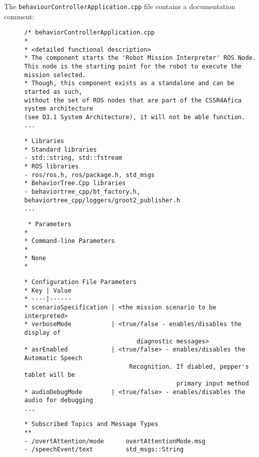 \documentclass{CSSRforAfrica}
\newcommand{\checkboxChecked}{\fbox{\ding{51}}} %
\begin{document}
\noindent The {\small \verb+behaviourControllerApplication.cpp+} file contains a documentation comment:

\begin{description}

\item[\checkboxChecked] 
 {\small 
\begin{verbatim}
/* behaviorControllerApplication.cpp
* 
* <detailed functional description>
* The component starts the 'Robot Mission Interpreter' ROS Node. 
This node is the starting point for the robot to execute the mission selected.
* Though, this component exists as a standalone and can be started as such, 
without the set of ROS nodes that are part of the CSSR4Afica system architecture
(see D3.1 System Architecture), it will not be able function.
...
\end{verbatim}}

\item[\checkboxChecked] 
 {\small 
\begin{verbatim}
* Libraries
* Standard libraries
- std::string, std::fstream
* ROS libraries
- ros/ros.h, ros/package.h, std_msgs
* BehaviorTree.Cpp libraries
- behaviortree_cpp/bt_factory.h, behaviortree_cpp/loggers/groot2_publisher.h
...
\end{verbatim}}

\item[\checkboxChecked] 
 {\small 
\begin{verbatim}
 * Parameters
*
* Command-line Parameters
*
* None
*
\end{verbatim}}


\item[\checkboxChecked] 
 {\small 
\begin{verbatim}
* Configuration File Parameters
* Key | Value
* ----|------
* scenarioSpecification | <the mission scenario to be interpreted>
* verboseMode           | <true/false - enables/disables the display of 
                               diagnostic messages>
* asrEnabled            | <true/false> - enables/disables the Automatic Speech 
                             Recognition. If diabled, pepper's tablet will be 
                                          primary input method
* audioDebugMode        | <true/false> - enables/disables the audio for debugging
...
\end{verbatim}}

\item[\checkboxChecked] 
 {\small 
\begin{verbatim}
* Subscribed Topics and Message Types
**
- /overtAttention/mode      overtAttentionMode.msg
- /speechEvent/text         std_msgs::String
\end{verbatim}}


\end{description}
\end{document}
